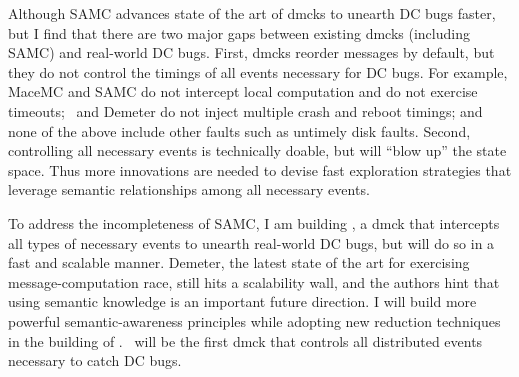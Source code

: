 \documentclass[10pt]{article}
\begin{document}
Although SAMC advances state of the art of dmcks to unearth DC bugs faster, but
I find that there are two major gaps between existing dmcks (including SAMC) and
real-world DC bugs. First, dmcks reorder messages by default, but they do not
control the timings of all events necessary for DC bugs. For example, MaceMC and
SAMC do not intercept local computation and do not exercise timeouts; \modist\
and Demeter do not inject multiple crash and reboot timings; and none of the
above include other faults such as untimely disk faults.
%
Second, controlling all necessary events is technically doable, but will ``blow
up'' the state space. Thus more innovations are needed to devise fast
exploration strategies that leverage semantic relationships among all necessary
events.


To address the incompleteness of SAMC, I am building \fullcheck, a dmck that
intercepts all types of necessary events to unearth real-world DC bugs, but will
do so in a fast and scalable manner. Demeter, the latest state of the art for
exercising message-computation race, still hits a scalability wall, and the
authors hint that using semantic knowledge is an important future direction. I
will build more powerful semantic-awareness principles while adopting new
reduction techniques in the building of \fullcheck. \fullcheck\ will be the
first dmck that controls all distributed events necessary to catch DC bugs.


\end{document}
